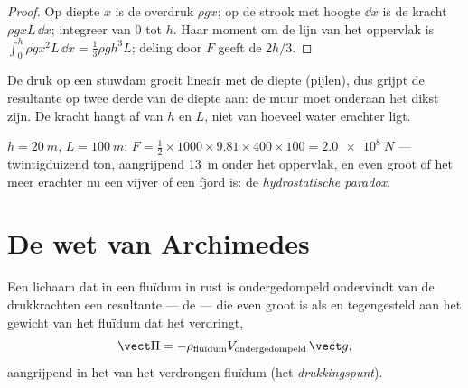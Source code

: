 \begin{proof}
Op diepte $x$ is de overdruk $\rho gx$; op de strook met hoogte
$\dd x$ is de kracht $\rho gxL\,\dd x$; integreer van $0$ tot $h$. Haar
moment om de lijn van het oppervlak is $\int_0^h\rho gx^2L\,\dd x = \tfrac13\rho gh^3L$;
deling door $F$ geeft de  $2h/3$.
\end{proof}

\begin{omfigure}

{\small De druk op een stuwdam groeit lineair met de diepte (pijlen), dus grijpt de
resultante op twee derde van de diepte aan: de muur moet onderaan het dikst
zijn. De kracht hangt af van $h$ en $L$, niet van hoeveel water
erachter ligt.}
\end{omfigure}

\begin{example}\label{ex:b1:fluid-statics:dam}
$h = \qty{20}{m}$, $L = \qty{100}{m}$: $F = \tfrac12 \times 1000 \times 9.81 \times
400 \times 100 = \qty{2.0e8}{N}$ --- twintigduizend ton, aangrijpend
\qty{13}{m} onder het oppervlak, en even groot of het meer erachter nu een vijver
of een fjord is: de \emph{hydrostatische paradox}.
\end{example}

\section{De wet van Archimedes}

\begin{theorem}[Archimedes]\label{thm:b1:fluid-statics:archimedes}
Een lichaam dat in een fluïdum in rust is ondergedompeld ondervindt van de drukkrachten
een resultante --- de \emph{} --- die even groot is als en tegengesteld
aan het gewicht van het fluïdum dat het verdringt,
\[
\vect\Pi = -\rho_{\text{fluïdum}}V_{\text{ondergedompeld}}\,\vect g ,
\]
aangrijpend in het  van het verdrongen fluïdum (het
\emph{drukkingspunt}).
\end{theorem}


